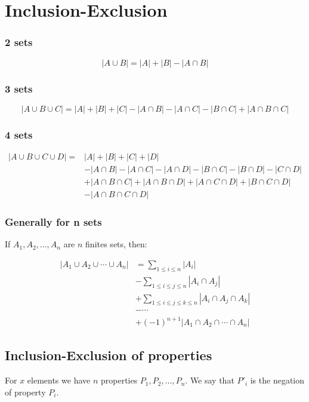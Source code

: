 
\section{Inclusion-Exclusion}
\subsubsection{2 sets}
\[ |A \cup B| = |A| + |B| - |A \cap B| \]
\subsubsection{3 sets}
\[ |A \cup B \cup C| = |A| + |B| + |C| - |A \cap B| - |A \cap C| - |B \cap C| + |A \cap B \cap C| \]
\subsubsection{4 sets}
\begin{align*}
    |A \cup B \cup C \cup D|
    =& |A| + |B| + |C| + |D| \\
    &- |A \cap B| - |A \cap C| - |A \cap D| - |B \cap C| - |B \cap D| - |C \cap D| \\
    &+ |A \cap B \cap C| + |A \cap B \cap D| + |A \cap C \cap D| + |B \cap C \cap D| \\
    &- |A \cap B \cap C \cap D|
\end{align*}

\subsubsection{Generally for n sets}
If \(A_1, A_2, \ldots, A_n\) are $n$ finites sets, then:

\begin{align*}
    |A_1 \cup A_2 \cup \cdots \cup A_n |
&= \sum_{1 \le i \le n} |A_i| \\
&- \sum_{1 \le i \le j \le n} |A_i \cap A_j| \\
&+ \sum_{1 \le i \le j \le k \le n} |A_i \cap A_j \cap A_k| \\
&- \cdots \\
&+ (-1)^{n+1}|A_1 \cap A_2 \cap \cdots \cap A_n|
\end{align*}

\subsection{Inclusion-Exclusion of properties}
For $x$ elements we have $n$ properties \(P_1, P_2, \ldots, P_n\). We say that \(P'_i\) is the negation of property \(P_i\).

